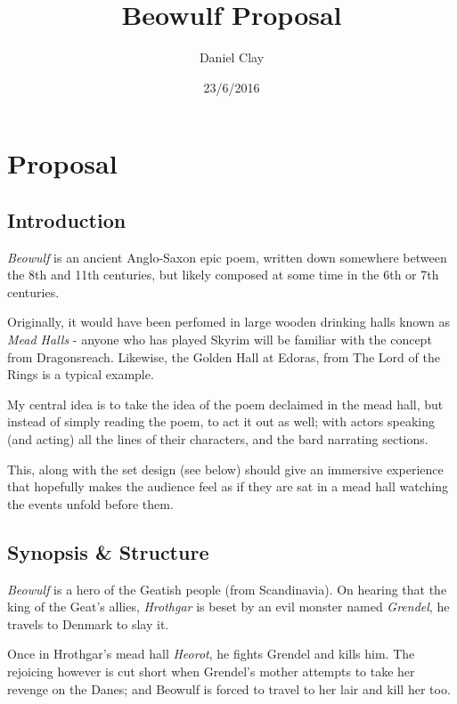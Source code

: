 \documentclass[a4paper]{article}
\begin{document}
\title{Beowulf Proposal}
\date{23/6/2016}
\author{
Daniel Clay \\ 
}
\maketitle

\section{Proposal}

\subsection{Introduction}

\textit{Beowulf} is an ancient Anglo-Saxon epic poem, written down somewhere
between the 8th and 11th centuries, but likely composed at some time in the 
6th or 7th centuries. 

Originally, it would have been perfomed in large wooden drinking halls known as 
\textit{Mead Halls} - anyone who has played Skyrim will be familiar with the concept
from Dragonsreach. Likewise, the Golden Hall at Edoras, from The Lord of the Rings is 
a typical example. 

My central idea is to take the idea of the poem declaimed in the mead hall, but instead 
of simply reading the poem, to act it out as well; with actors speaking (and acting) all
the lines of their characters, and the bard narrating sections. 

This, along with the set design (see below) should give an immersive experience
that hopefully makes the audience feel as if they are sat in a mead hall watching the events
unfold before them.

\subsection{Synopsis \& Structure}%

\textit{Beowulf} is a hero of the Geatish people (from Scandinavia). On hearing that the
king of the Geat's allies, \textit{Hrothgar} is beset by an evil monster named 
\textit{Grendel}, he travels to Denmark to slay it.

Once in Hrothgar's mead hall \textit{Heorot}, he fights Grendel and kills him.
The rejoicing however is cut short when Grendel's mother attempts to take her 
revenge on the Danes; and Beowulf is forced to travel to her lair and kill her too.
\end{document}
